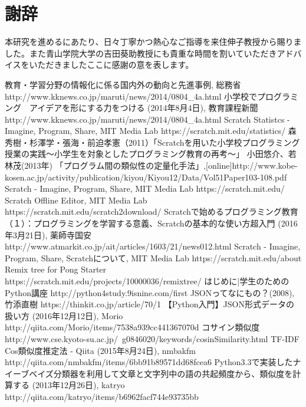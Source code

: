 \documentclass[a4paper,10pt,onecolumn,oneside,openany]{jsbook}
\begin{document}
\chapter{謝辞}
本研究を進めるにあたり、日々丁寧かつ熱心なご指導を来住伸子教授から賜りました。また青山学院大学の吉田葵助教授にも貴重な時間を割いていただきアドバイスをいただきましたここに感謝の意を表します。

\begin{thebibliography}{23}

教育・学習分野の情報化に係る国内外の動向と先進事例, 総務省 http://www.kknews.co.jp/maruti/news/2014/0804\_4a.html
小学校でプログラミング　アイデアを形にする力をつける (2014年8月4日), 教育課程新聞 http://www.kknews.co.jp/maruti/news/2014/0804\_4a.html
Scratch Statistcs - Imagine, Program, Share, MIT Media Lab https://scratch.mit.edu/statistics/
森秀樹・杉澤学・張海・前迫孝憲（2011）「Scratchを用いた小学校プログラミング授業の実践〜小学生を対象としたプログラミング教育の再考〜」
小田悠介、若林茂(2013年) 「プログラム間の類似性の定量化手法」,[online]http://www.kobe-kosen.ac.jp/activity/publication/kiyou/Kiyou12/Data/Vol51Paper103-108.pdf
Scratch - Imagine, Program, Share, MIT Media Lab https://scratch.mit.edu/
Scratch Offline Editor, MIT Media Lab https://scratch.mit.edu/scratch2download/
Scratchで始めるプログラミング教育（１）：プログラミングを学習する意義、Scratchの基本的な使い方超入門 (2016年3月21日), 薬師寺国安 http://www.atmarkit.co.jp/ait/articles/1603/21/news012.html
Scratch - Imagine, Program, Share, Scratchについて, MIT Media Lab https://scratch.mit.edu/about
Remix tree for Pong Starter https://scratch.mit.edu/projects/10000036/remixtree/
はじめに|学生のためのPython講座 http://python4study.9isnine.com/first
JSONってなにもの？(2008), 竹添直樹 https://thinkit.co.jp/article/70/1
【Python入門】JSON形式データの扱い方 (2016年12月12日), Morio http://qiita.com/Morio/items/7538a939cc441367070d
 コサイン類似度 http://www.cse.kyoto-su.ac.jp/~g0846020/keywords/cosinSimilarity.html
 TF-IDF Cos類似度推定法 - Qiita (2015年8月24日), nmbakfm http://qiita.com/nmbakfm/items/6bb91b89571dd68fcea6
 Python3.3で実装したナイーブベイズ分類器を利用して文章と文字列中の語の共起頻度から、類似度を計算する (2013年12月26日), katryo http://qiita.com/katryo/items/b6962facf744e93735bb

\end{thebibliography}
\end{document}
